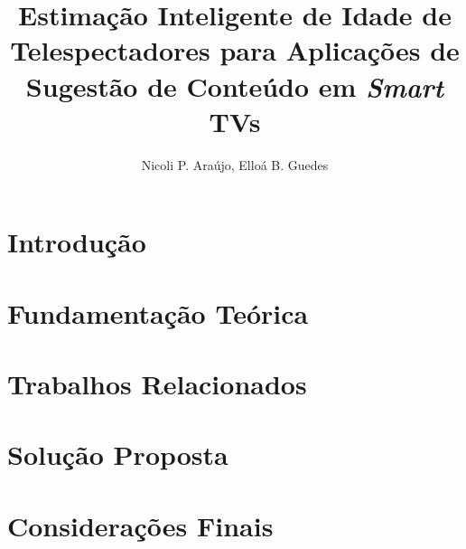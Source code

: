 \documentclass[12pt]{article}
\title{Estimação Inteligente de Idade de Telespectadores para Aplicações de Sugestão de Conteúdo em \emph{Smart} TVs}
\author{Nicoli P. Araújo, Elloá B. Guedes}
\begin{document}

\maketitle



\section{Introdução}\label{sec:intro}


\section{Fundamentação Teórica}\label{sec:fund_teorica}


\section{Trabalhos Relacionados}\label{sec:trab_relac}


\section{Solução Proposta}\label{sec:solucao_proposta}


\section{Considerações Finais}\label{sec:consid_finais}




\end{document}
